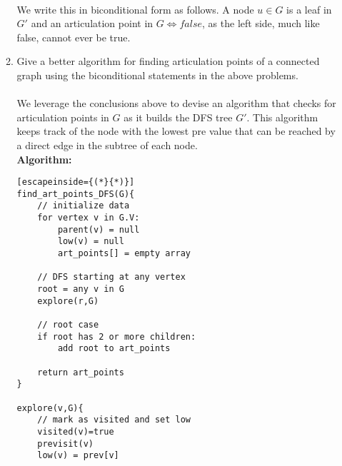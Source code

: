 \documentclass{article}
\begin{document}
\begin{enumerate}
\begin{enumerate}
	\\ We write this in biconditional form as follows. A node $u \in G$ is a leaf in $G'$ and an articulation point in $G \iff false$, as the left side, much like false, cannot ever be true.
	\item Give a better algorithm for finding articulation points of a connected graph using the biconditional statements in the above problems.
	\\\\ We leverage the conclusions above to devise an algorithm that checks for articulation points in $G$ as it builds the DFS tree $G'$. This algorithm keeps track of the node with the lowest pre value that can be reached by a direct edge in the subtree of each node.
	\\ \textbf{Algorithm:}
	\begin{lstlisting}[escapeinside={(*}{*)}]
find_art_points_DFS(G){
	// initialize data
	for vertex v in G.V:
		parent(v) = null
		low(v) = null
		art_points[] = empty array
		
	// DFS starting at any vertex
	root = any v in G
	explore(r,G)
	
	// root case
	if root has 2 or more children:
		add root to art_points
	
	return art_points
}

explore(v,G){
	// mark as visited and set low
	visited(v)=true
	previsit(v)
	low(v) = prev[v]
	

\end{lstlisting}
\end{enumerate}
\end{enumerate}
\end{document}
